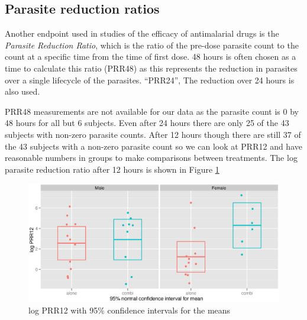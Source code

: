\subsection{Parasite reduction ratios}
Another endpoint used in studies of the efficacy of antimalarial drugs is the \emph{Parasite Reduction Ratio}, which is the ratio of the pre-dose parasite count to the count at a specific time from the time of first dose. 48 hours is often chosen as a time to calculate this ratio (PRR48) as this represents the reduction in parasites over a single lifecycle of the parasites\cite{white}. ``PRR24'', The reduction over 24 hours is also used\cite{newton}.

PRR48 measurements are not available for our data as the parasite count is 0 by 48 hours for all but 6 subjects. Even after 24 hours there are only 25 of the 43 subjects with non-zero parasite counts. After 12 hours though there are still 37 of the 43 subjects with a non-zero parasite count so we can look at PRR12 and have reasonable numbers in groups to make comparisons between treatments. The log parasite reduction ratio after 12 hours is shown in Figure \ref{prr12}
\begin{figure}
\includegraphics[width=150mm]{prr12.eps} 
\caption{log PRR12 with 95\% confidence intervals for the means}
\label{prr12}
\end{figure}

